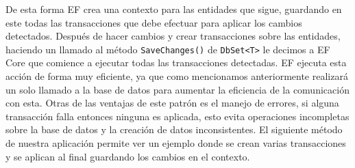 De esta forma EF crea una contexto para las entidades que sigue, guardando en este todas las transacciones que debe efectuar para aplicar los cambios detectados. Después de hacer cambios y crear transacciones sobre las entidades, haciendo un llamado al método \lstinline{SaveChanges()} de \lstinline{DbSet<T>} le decimos a EF Core que comience a ejecutar todas las transacciones detectadas. EF ejecuta esta acción de forma muy eficiente, ya que como mencionamos anteriormente realizará un solo llamado a la base de datos para aumentar la eficiencia de la comunicación con esta. Otras de las ventajas de este patrón es el manejo de errores, si alguna transacción falla entonces ninguna es aplicada, esto evita operaciones incompletas sobre la base de datos y la creación de datos inconsistentes. El siguiente método de nuestra aplicación permite ver un ejemplo donde se crean varias transacciones y se aplican al final guardando los cambios en el contexto.

